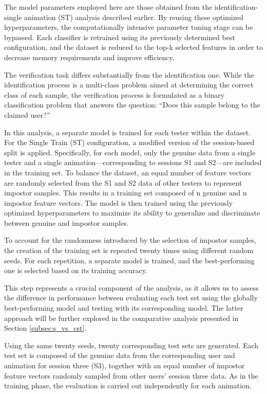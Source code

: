 \documentclass{article}
\begin{document}
The model parameters employed here are those obtained from the identification-single animation (ST) analysis described earlier.
By reusing these optimized hyperparameters, the computationally intensive parameter tuning stage can be bypassed.
Each classifier is retrained using its previously determined best configuration, and the dataset is reduced to the top-k selected features in order to decrease memory requirements and improve efficiency.

The verification task differs substantially from the identification one.
While the identification process is a multi-class problem aimed at determining the correct class of each sample, the verification process is formulated as a binary classification problem that answers the question: “Does this sample belong to the claimed user?”

In this analysis, a separate model is trained for each tester within the dataset.
For the Single Train (ST) configuration, a modified version of the session-based split is applied.
Specifically, for each model, only the genuine data from a single tester and a single animation—corresponding to sessions S1 and S2—are included in the training set.
To balance the dataset, an equal number of feature vectors are randomly selected from the S1 and S2 data of other testers to represent impostor samples.
This results in a training set composed of n genuine and n impostor feature vectors.
The model is then trained using the previously optimized hyperparameters to maximize its ability to generalize and discriminate between genuine and impostor samples.

To account for the randomness introduced by the selection of impostor samples, the creation of the training set is repeated twenty times using different random seeds.
For each repetition, a separate model is trained, and the best-performing one is selected based on its training accuracy.

This step represents a crucial component of the analysis, as it allows us to assess the difference in performance between evaluating each test set using the globally best-performing model and testing with its corresponding model.
The latter approach will be further explored in the comparative analysis presented in Section \ref{subsec:s_vs_cst}.

Using the same twenty seeds, twenty corresponding test sets are generated.
Each test set is composed of the genuine data from the corresponding user and animation for session three (S3), together with an equal number of impostor feature vectors randomly sampled from other users’ session three data.
As in the training phase, the evaluation is carried out independently for each animation.
\end{document}
